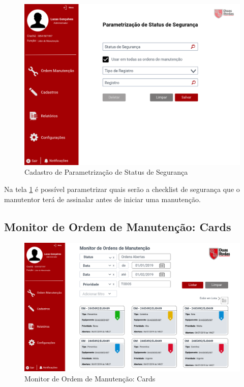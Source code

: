 \begin{figure}[htb]
	\caption{\label{web_param-status-seguranca}Cadastro de Parametrização de Status de Segurança}
	\begin{center}
		\includegraphics[scale=0.55]{./Figuras/web/param-status-seguranca.png}
	\end{center}
\end{figure}

Na tela \ref{web_param-status-seguranca} é possível parametrizar quais serão a checklist de segurança que o manutentor terá de assinalar antes de iniciar uma manutenção.

\newpage
\subsection{Monitor de Ordem de Manutenção: Cards}

\begin{figure}[htb]
	\caption{\label{web_monitor-om-card}Monitor de Ordem de Manutenção: Cards}
	\begin{center}
		\includegraphics[scale=0.45]{./Figuras/web/monitor-om-card.png}
	\end{center}
\end{figure}

